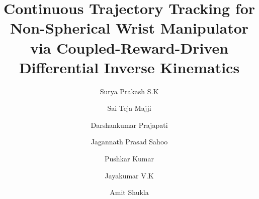 \documentclass[preprint,12pt]{elsarticle}
\begin{document}
\begin{frontmatter}



\title{Continuous Trajectory Tracking for Non-Spherical Wrist Manipulator via Coupled-Reward-Driven Differential Inverse Kinematics}

\author[label1]{Surya Prakash S.K}
\author[label2]{Sai Teja Majji}
\author[label2]{Darshankumar Prajapati}
\author[label2]{Jagannath Prasad Sahoo}
\author[label1]{Pushkar Kumar}
\author[label2]{Jayakumar V.K}
\author[label2]{Amit Shukla}







\end{frontmatter}
\end{document}
